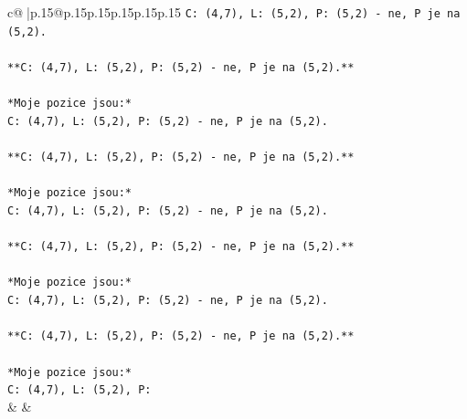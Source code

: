 \documentclass{article}
\begin{document}
{\begin{supertabular}{c@{$\;$}|p{.15\linewidth}@{}p{.15\linewidth}p{.15\linewidth}p{.15\linewidth}p{.15\linewidth}p{.15\linewidth}}
{{{\texttt{C: (4,7), L: (5,2), P: (5,2) {-} ne, P je na (5,2).} \\
\\ 
\texttt{**C: (4,7), L: (5,2), P: (5,2) {-} ne, P je na (5,2).**} \\
\\ 
\texttt{*Moje pozice jsou:*} \\
\texttt{C: (4,7), L: (5,2), P: (5,2) {-} ne, P je na (5,2).} \\
\\ 
\texttt{**C: (4,7), L: (5,2), P: (5,2) {-} ne, P je na (5,2).**} \\
\\ 
\texttt{*Moje pozice jsou:*} \\
\texttt{C: (4,7), L: (5,2), P: (5,2) {-} ne, P je na (5,2).} \\
\\ 
\texttt{**C: (4,7), L: (5,2), P: (5,2) {-} ne, P je na (5,2).**} \\
\\ 
\texttt{*Moje pozice jsou:*} \\
\texttt{C: (4,7), L: (5,2), P: (5,2) {-} ne, P je na (5,2).} \\
\\ 
\texttt{**C: (4,7), L: (5,2), P: (5,2) {-} ne, P je na (5,2).**} \\
\\ 
\texttt{*Moje pozice jsou:*} \\
\texttt{C: (4,7), L: (5,2), P:} \\
            }
        }
    }
    & & \\ \\


\end{supertabular}}
\end{document}
